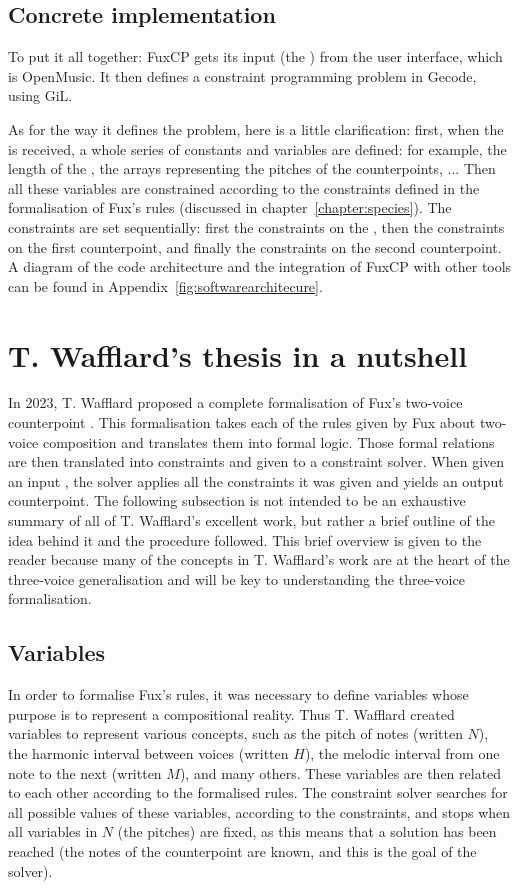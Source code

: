 \subsection{Concrete implementation}
To put it all together: FuxCP gets its input (the \cf) from the user interface, which is OpenMusic. It then defines a constraint programming problem in Gecode, using GiL. 

As for the way it defines the problem, here is a little clarification: first, when the \cfs is received, a whole series of constants and variables are defined: for example, the length of the \cf, the arrays representing the pitches of the counterpoints, ...
Then all these variables are constrained according to the constraints defined in the formalisation of Fux's rules (discussed in chapter~\ref{chapter:species}). The constraints are set sequentially: first the constraints on the \cf, then the constraints on the first counterpoint, and finally the constraints on the second counterpoint. A diagram of the code architecture and the integration of FuxCP with other tools can be found in Appendix~\ref{fig:softwarearchitecure}.


\section{T. Wafflard's thesis in a nutshell}\label{section:thomas-in-a-nutshell}

In 2023, T. Wafflard proposed a complete formalisation of Fux's two-voice counterpoint \cite{wafflard2023}. This formalisation takes each of the rules given by Fux about two-voice composition and translates them into formal logic. Those formal relations are then translated into constraints and given to a constraint solver. When given an input \cf, the solver applies all the constraints it was given and yields an output counterpoint. The following subsection is not intended to be an exhaustive summary of all of T. Wafflard's excellent work, but rather a brief outline of the idea behind it and the procedure followed. This brief overview is given to the reader because many of the concepts in T. Wafflard's work are at the heart of the three-voice generalisation and will be key to understanding the three-voice formalisation.

\subsection{Variables} \label{Wafflard-variables}
In order to formalise Fux's rules, it was necessary to define variables whose purpose is to represent a compositional reality. Thus T. Wafflard created variables to represent various concepts, such as the pitch of notes (written $N$), the harmonic interval between voices (written $H$), the melodic interval from one note to the next (written $M$), and many others. These variables are then related to each other according to the formalised rules. The constraint solver searches for all possible values of these variables, according to the constraints, and stops when all variables in $N$ (the pitches) are fixed, as this means that a solution has been reached (the notes of the counterpoint are known, and this is the goal of the solver).

